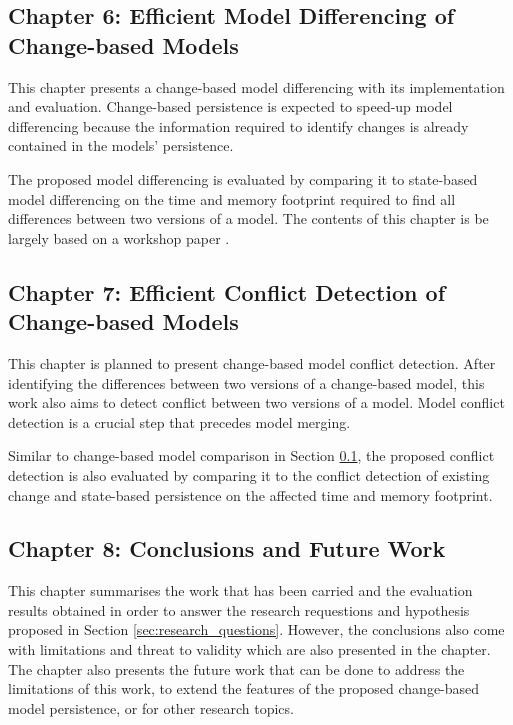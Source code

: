 \subsection{Chapter 6: Efficient Model Differencing of Change-based Models}
\label{sec:chapter_6_model_differencing}
This chapter presents a change-based model differencing with its implementation and evaluation. Change-based persistence is expected to speed-up model differencing because the information required to identify changes is already contained in the models' persistence. 

The proposed model differencing is evaluated by comparing it to state-based model differencing on the time and memory footprint required to find all differences between two versions of a model. The contents of this chapter is be largely based on a workshop paper \cite{yohannis2019efficient}.

\subsection{Chapter 7: Efficient Conflict Detection of Change-based Models}
\label{sec:chapter_7_conflict_detection}
This chapter is planned to present change-based model conflict detection. After identifying the differences between two versions of a change-based model, this work also aims to detect conflict between two versions of a model. Model conflict detection is a crucial step that precedes model merging.

Similar to change-based model comparison in Section \ref{sec:chapter_6_model_differencing}, the proposed conflict detection is also evaluated by comparing it to the conflict detection of existing change and state-based persistence on the affected time and memory footprint.

\subsection{Chapter 8: Conclusions and Future Work}
\label{sec:chapter_8_conclusions_and_future_work}
This chapter summarises the work that has been carried and the evaluation results obtained in order to answer the research requestions and hypothesis proposed in Section \ref{sec:research_questions}. However, the conclusions also come with limitations and threat to validity which are also presented in the chapter. The chapter also presents the future work that can be done to address the limitations of this work, to extend the features of the proposed change-based model persistence, or for other research topics.


